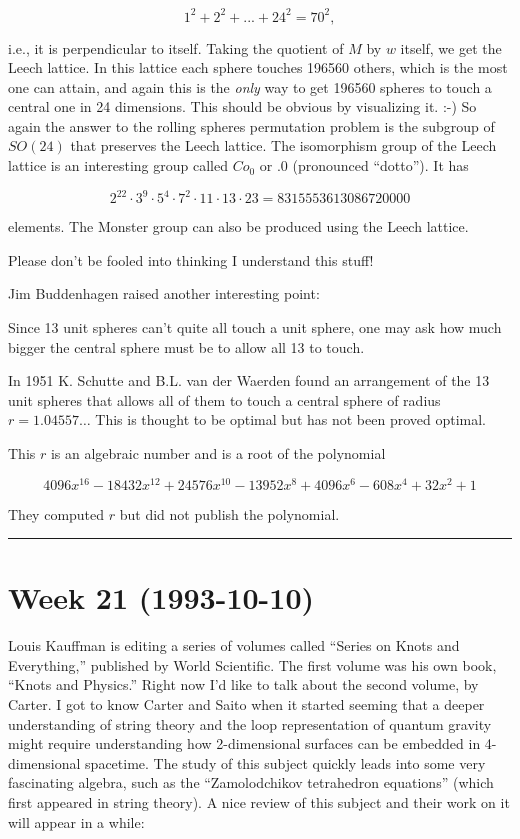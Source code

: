 \documentclass{article}
\begin{document}
\[1^2 + 2^2 + ... + 24^2 = 70^2,\]

i.e., it is perpendicular to itself. Taking the quotient of \(M\) by
\(w\) itself, we get the Leech lattice. In this lattice each sphere
touches 196560 others, which is the most one can attain, and again this
is the \emph{only} way to get 196560 spheres to touch a central one in
24 dimensions. This should be obvious by visualizing it. :-) So again
the answer to the rolling spheres permutation problem is the subgroup of
\(SO(24)\) that preserves the Leech lattice. The isomorphism group of
the Leech lattice is an interesting group called \(Co_0\) or \(.0\)
(pronounced ``dotto''). It has

\[2^{22}\cdot 3^9\cdot 5^4\cdot 7^2\cdot 11\cdot 13\cdot 23 = 8315553613086720000\]

elements. The Monster group can also be produced using the Leech
lattice.

Please don't be fooled into thinking I understand this stuff!

Jim Buddenhagen raised another interesting point:

Since 13 unit spheres can't quite all touch a unit sphere, one may ask
how much bigger the central sphere must be to allow all 13 to touch.

In 1951 K. Schutte and B.L. van der Waerden found an arrangement of the
13 unit spheres that allows all of them to touch a central sphere of
radius \(r=1.04557\ldots\) This is thought to be optimal but has not
been proved optimal.

This \(r\) is an algebraic number and is a root of the polynomial

\[4096 x^{16} - 18432 x^{12} + 24576 x^{10} - 13952 x^8 + 4096 x^6 - 608x^4 + 32 x^2 + 1\]

They computed \(r\) but did not publish the polynomial.

\begin{center}\rule{0.5\linewidth}{0.5pt}\end{center}
\hypertarget{week-21-1993-10-10}{%
\section{Week 21 (1993-10-10)}\label{week-21-1993-10-10}}

Louis Kauffman is editing a series of volumes called ``Series on Knots
and Everything,'' published by World Scientific. The first volume was
his own book, ``Knots and Physics.'' Right now I'd like to talk about
the second volume, by Carter. I got to know Carter and Saito when it
started seeming that a deeper understanding of string theory and the
loop representation of quantum gravity might require understanding how
2-dimensional surfaces can be embedded in 4-dimensional spacetime. The
study of this subject quickly leads into some very fascinating algebra,
such as the ``Zamolodchikov tetrahedron equations'' (which first
appeared in string theory). A nice review of this subject and their work
on it will appear in a while:
\end{document}
